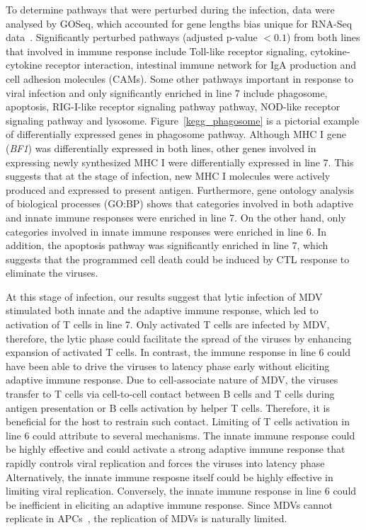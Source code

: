 \documentclass[10pt]{article}
\begin{document}
To determine pathways that were perturbed during the infection, data were
analysed by GOSeq, which accounted for gene lengths bias unique for RNA-Seq data~\cite{}.
Significantly perturbed pathways (adjusted p-value $< 0.1$) from both lines that involved in
immune response include Toll-like receptor signaling, cytokine-cytokine receptor interaction,
intestinal immune network for IgA production and cell adhesion molecules (CAMs).
Some other pathways important in response to viral infection and only significantly
enriched in line 7 include phagosome, apoptosis, RIG-I-like receptor signaling pathway pathway,
NOD-like receptor signaling pathway and lysosome.
Figure~\ref{kegg_phagosome} is a pictorial example of differentially expressed genes in phagosome pathway.
Although MHC I gene (\textit{BF1}) was differentially expressed in both lines, other genes involved in
expressing newly synthesized MHC I were differentially expressed in line 7.
This suggests that at the stage of infection, new MHC I molecules were actively produced and expressed to
present antigen.
Furthermore, gene ontology analysis of biological processes (GO:BP) shows that categories involved in
both adaptive and innate immune responses were enriched in line 7.
On the other hand, only categories involved in innate immune responses were enriched in line 6.
In addition, the apoptosis pathway was significantly enriched in line 7, which suggests that the programmed
cell death could be induced by CTL response to eliminate the viruses.

At this stage of infection, our results suggest that lytic infection of MDV stimulated
both innate and the adaptive immune response, which led to activation of T cells in line 7.
Only activated T cells are infected by MDV, therefore, the lytic phase could facilitate the spread of
the viruses by enhancing expansion of activated T cells.
In contrast, the immune response in line 6 could have been able to drive the viruses to latency phase early
without eliciting adaptive immune response.
Due to cell-associate nature of MDV, the viruses transfer to T cells via cell-to-cell contact between B cells and
T cells during antigen presentation or B cells activation by helper T cells.
Therefore, it is beneficial for the host to restrain such contact.
Limiting of T cells activation in line 6 could attribute to several mechanisms.
The innate immune response could be highly effective and could activate a strong adaptive immune response that
rapidly controls viral replication and forces the viruses into latency phase
Alternatively, the innate immune resposne itself could be highly effective in limiting viral replication.
Conversely, the innate immune response in line 6 could be inefficient in eliciting an adaptive immune
response. Since MDVs cannot replicate in APCs~\cite{}, the replication of MDVs is naturally limited.
\end{document}
